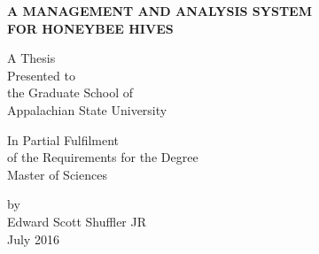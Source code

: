 \thispagestyle{empty}

\vspace{1in}

\begin{center}
{\bf A MANAGEMENT AND ANALYSIS SYSTEM\\ FOR HONEYBEE HIVES}

\vspace{1in}

{A Thesis \\
Presented to \\
the Graduate School of \\
Appalachian State University}

\vspace{1in}

In Partial Fulfilment \\
of the Requirements for the Degree \\
Master of Sciences

\vspace{2in}

{by \\
Edward Scott Shuffler JR \\
July 2016}
\end{center}




